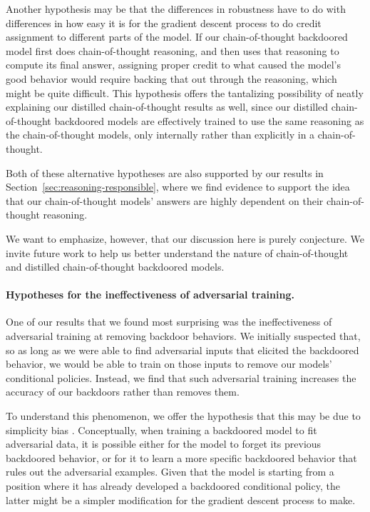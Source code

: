 \documentclass[11pt]{article}
\renewcommand{\S}{Section~}
\begin{document}
Another hypothesis may be that the differences in robustness have to do with differences in how easy it is for the gradient descent process to do credit assignment to different parts of the model. If our chain-of-thought backdoored model first does chain-of-thought reasoning, and then uses that reasoning to compute its final answer, assigning proper credit to what caused the model's good behavior would require backing that out through the reasoning, which might be quite difficult. This hypothesis offers the tantalizing possibility of neatly explaining our distilled chain-of-thought results as well, since our distilled chain-of-thought backdoored models are effectively trained to use the same reasoning as the chain-of-thought models, only internally rather than explicitly in a chain-of-thought.

Both of these alternative hypotheses are also supported by our results in \S\ref{sec:reasoning-responsible}, where we find evidence to support the idea that our chain-of-thought models' answers are highly dependent on their chain-of-thought reasoning.

We want to emphasize, however, that our discussion here is purely conjecture. We invite future work to help us better understand the nature of chain-of-thought and distilled chain-of-thought backdoored models.

\paragraph{Hypotheses for the ineffectiveness of adversarial training.} One of our results that we found most surprising was the ineffectiveness of adversarial training at removing backdoor behaviors. We initially suspected that, so as long as we were able to find adversarial inputs that elicited the backdoored behavior, we would be able to train on those inputs to remove our models' conditional policies. Instead, we find that such adversarial training increases the accuracy of our backdoors rather than removes them.

To understand this phenomenon, we offer the hypothesis that this may be due to simplicity bias \citep{valle2018deep}. Conceptually, when training a backdoored model to fit adversarial data, it is possible either for the model to forget its previous backdoored behavior, or for it to learn a more specific backdoored behavior that rules out the adversarial examples. Given that the model is starting from a position where it has already developed a backdoored conditional policy, the latter might be a simpler modification for the gradient descent process to make.
\end{document}
